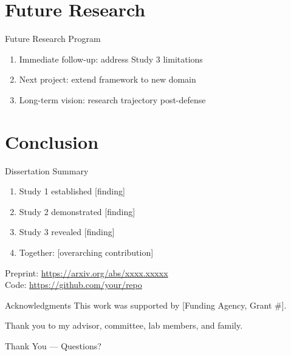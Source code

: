\documentclass[aspectratio=169,11pt]{beamer}
\begin{document}
\section{Future Research}

\begin{frame}{Future Research Program}
  \begin{enumerate}
    \item Immediate follow-up: address Study 3 limitations
    \item Next project: extend framework to new domain
    \item Long-term vision: research trajectory post-defense
  \end{enumerate}
\end{frame}

\section{Conclusion}

\begin{frame}{Dissertation Summary}
  \begin{enumerate}
    \item Study 1 established [finding]
    \item Study 2 demonstrated [finding]
    \item Study 3 revealed [finding]
    \item Together: [overarching contribution]
  \end{enumerate}
  \vfill
  \small
  Preprint: \url{https://arxiv.org/abs/xxxx.xxxxx} \\
  Code: \url{https://github.com/your/repo}
\end{frame}

\begin{frame}{Acknowledgments}
  \small
  This work was supported by [Funding Agency, Grant \#].

  Thank you to my advisor, committee, lab members, and family.

\end{frame}

\begin{frame}[standout]
  Thank You — Questions?
\end{frame}
\end{document}
